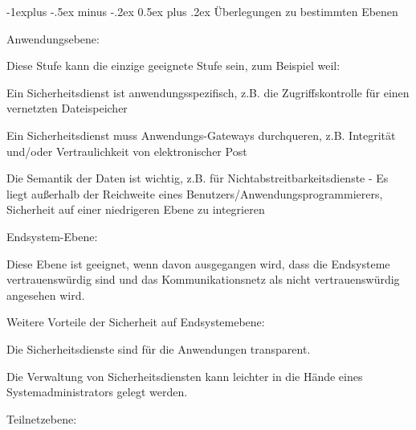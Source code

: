 \documentclass[a4paper]{article}
\makeatletter
\renewcommand{\subsection}{\@startsection{subsection}{2}{0mm}%
 {-1explus -.5ex minus -.2ex}%
 {0.5ex plus .2ex}%
 {\normalfont\normalsize\bfseries}}
\makeatother
\begin{document}
\begin{multicols}{3}
      \subsection{Überlegungen zu bestimmten
            Ebenen}

      \begin{itemize*}
            \item
            Anwendungsebene:

            \begin{itemize*}
                  \item Diese Stufe kann die einzige geeignete Stufe sein, zum Beispiel weil:
                  \begin{itemize*} \item Ein Sicherheitsdienst ist anwendungsspezifisch, z.B. die Zugriffskontrolle für einen vernetzten Dateispeicher \item Ein Sicherheitsdienst muss Anwendungs-Gateways durchqueren, z.B. Integrität und/oder Vertraulichkeit von elektronischer Post \item Die Semantik der Daten ist wichtig, z.B. für Nichtabstreitbarkeitsdienste - Es liegt außerhalb der Reichweite eines Benutzers/Anwendungsprogrammierers, Sicherheit auf einer niedrigeren Ebene zu integrieren \end{itemize*}
            \end{itemize*}
            \item
            Endsystem-Ebene:

            \begin{itemize*}
                  \item Diese Ebene ist geeignet, wenn davon ausgegangen wird, dass die Endsysteme vertrauenswürdig sind und das Kommunikationsnetz als nicht vertrauenswürdig angesehen wird.
                  \item Weitere Vorteile der Sicherheit auf Endsystemebene:
                  \begin{itemize*} \item Die Sicherheitsdienste sind für die Anwendungen transparent. \item Die Verwaltung von Sicherheitsdiensten kann leichter in die Hände eines Systemadministrators gelegt werden. \end{itemize*}
            \end{itemize*}
            \item
            Teilnetzebene:


\end{itemize*}
\end{multicols}
\end{document}
